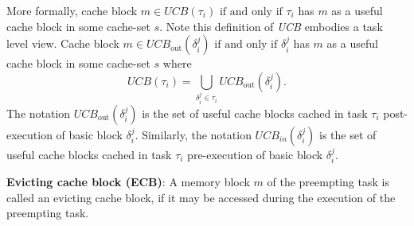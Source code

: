 \noindent More formally, cache block \begin{math}m \in \textit{UCB}(\tau_{i})\textrm{ if and only if } \tau_{i}\end{math} has $m$ as a useful cache block in some cache-set $s$.  Note this definition of \textit{UCB} embodies a task level view.  Cache block \begin{math}m \in \textit{UCB}_{\textrm{out}}(\delta_{i}^{j})\textrm{ if and only if }\delta_{i}^{j}\end{math} has $m$ as a useful cache block in some cache-set $s$ where
\begin{equation}\label{eqn:ucb-task}
    \textit{UCB}(\tau_{i}) = \bigcup_{\delta_{i}^{j} \in \tau_{i}} \textit{UCB}_{\textrm{out}}(\delta_{i}^{j}).
\end{equation}
\noindent The notation \begin{math}\textit{UCB}_{\textrm{out}}(\delta_{i}^{j})\end{math} is the set of useful cache blocks cached in task \begin{math}\tau_{i}\end{math} post-execution of basic block \begin{math}\delta_{i}^{j}\end{math}.  Similarly, the notation \begin{math}\textit{UCB}_{in}(\delta_{i}^{j})\end{math} is the set of useful cache blocks cached in task \begin{math}\tau_{i}\end{math} pre-execution of basic block \begin{math}\delta_{i}^{j}\end{math}.

\begin{definition}
\textbf{Evicting cache block (ECB)}: A memory block $m$ of the preempting task is called an evicting cache block, if it may be accessed during the execution of the preempting task.
\end{definition}

